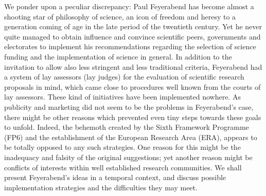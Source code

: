 

We ponder upon a peculiar discrepancy:
Paul Feyerabend has become almost a shooting star of philosophy of science,
an icon of freedom and heresy
to a generation coming of age in the late period of the twentieth century.
Yet he never quite managed to obtain influence and convince scientific peers, governments and electorates to implement
his recommendations regarding the selection of science funding and the implementation
of science in general.
In addition to the invitation to allow also less stringent and less traditional criteria,
Feyerabend had a system of lay assessors (lay judges)
for the evaluation of scientific research proposals in mind,
which came close to procedures well known from the courts of lay assessors.
These kind of initiatives have been implemented nowhere.
As publicity and marketing did not seem to be the problems in Feyerabend's case,
there might be other reasons which prevented even tiny steps towards these
goals to unfold.
Indeed, the behemoth created by the Sixth Framework Programme (FP6)
and the establishment of the European Research Area (ERA),
appears to be totally opposed to any such strategies.
One reason for this might be the inadequacy and falsity of the
original suggestions; yet another
reason might be conflicts of interests within well established research communities.
We shall present Feyerabend's ideas in a temporal context,
and discuss possible implementation strategies and the difficulties they may meet.
